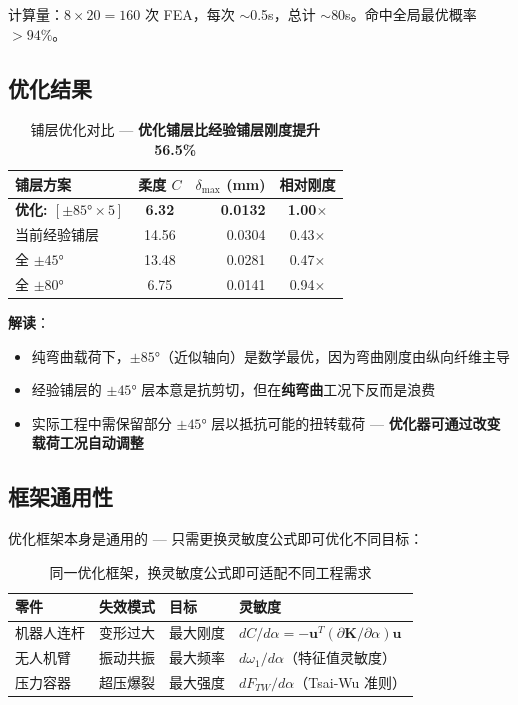 \documentclass[11pt,a4paper]{article}
\begin{document}
计算量：$8 \times 20 = 160$ 次 FEA，每次 $\sim$0.5s，总计 $\sim$80s。命中全局最优概率 $> 94\%$。

\subsection{优化结果}

\begin{table}[H]
\centering
\begin{tabular}{l c r c}
\toprule
\textbf{铺层方案} & \textbf{柔度} $C$ & $\delta_{\max}$ (mm) & \textbf{相对刚度} \\
\midrule
\rowcolor{lightpass}
\textbf{优化: $[\pm 85° \times 5]$} & \textbf{6.32} & \textbf{0.0132} & \textbf{1.00$\times$} \\
当前经验铺层 & 14.56 & 0.0304 & 0.43$\times$ \\
全 $\pm 45°$ & 13.48 & 0.0281 & 0.47$\times$ \\
全 $\pm 80°$ & 6.75 & 0.0141 & 0.94$\times$ \\
\bottomrule
\end{tabular}
\caption{铺层优化对比 --- \textcolor{pass}{\textbf{优化铺层比经验铺层刚度提升 56.5\%}}}
\end{table}

\textbf{解读}：
\begin{itemize}[nosep]
\item 纯弯曲载荷下，$\pm 85°$（近似轴向）是数学最优，因为弯曲刚度由纵向纤维主导
\item 经验铺层的 $\pm 45°$ 层本意是抗剪切，但在\textbf{纯弯曲}工况下反而是浪费
\item 实际工程中需保留部分 $\pm 45°$ 层以抵抗可能的扭转载荷 --- \textbf{优化器可通过改变载荷工况自动调整}
\end{itemize}

\subsection{框架通用性}

优化框架本身是通用的 --- 只需更换灵敏度公式即可优化不同目标：

\begin{table}[H]
\centering
\small
\begin{tabularx}{\textwidth}{l l l X}
\toprule
\textbf{零件} & \textbf{失效模式} & \textbf{目标} & \textbf{灵敏度} \\
\midrule
机器人连杆 & 变形过大 & 最大刚度 & $dC/d\alpha = -\mathbf{u}^T(\partial\mathbf{K}/\partial\alpha)\mathbf{u}$ \\
无人机臂 & 振动共振 & 最大频率 & $d\omega_1/d\alpha$（特征值灵敏度） \\
压力容器 & 超压爆裂 & 最大强度 & $dF_{TW}/d\alpha$（Tsai-Wu 准则） \\
\bottomrule
\end{tabularx}
\caption{同一优化框架，换灵敏度公式即可适配不同工程需求}
\end{table}
\end{document}
